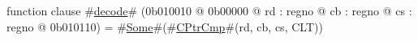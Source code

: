 function clause #\hyperref[zdecode]{decode}# (0b010010 @ 0b00000 @ rd : regno @ cb : regno @ cs : regno @ 0b010110) = #\hyperref[zSome]{Some}#(#\hyperref[zCPtrCmp]{CPtrCmp}#(rd, cb, cs, CLT))
